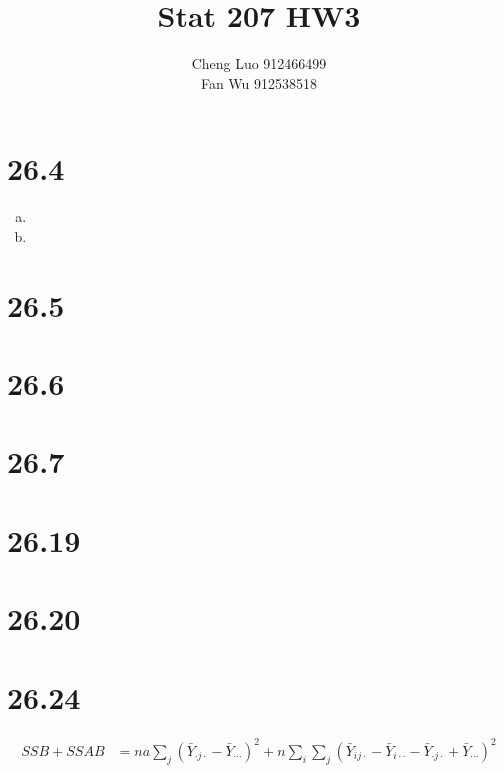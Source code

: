\documentclass{article}\usepackage[]{graphicx}\usepackage[]{color}
\begin{document}
\title{\huge \textbf{Stat 207 HW3} \\}
\author{\large Cheng Luo 912466499 \\ \large Fan Wu 912538518}
\maketitle

\clearpage

\section{26.4}

\begin{enumerate}[(a)]

\item

\item

\end{enumerate}

\section{26.5}

\section{26.6}

\section{26.7}

\section{26.19}

\section{26.20}

\section{26.24}

\begin{displaymath}
\begin{split}
SSB+SSAB &= na\sum_{j}(\bar{Y}_{\cdot j \cdot}-\bar{Y}_{\cdots})^2 + n\sum_i\sum_j(\bar{Y}_{ij\cdot}-\bar{Y}_{i\cdot\cdot}-\bar{Y}_{\cdot j \cdot}+\bar{Y}_{\cdots})^2
\end{split}
\end{displaymath}
\end{document}
